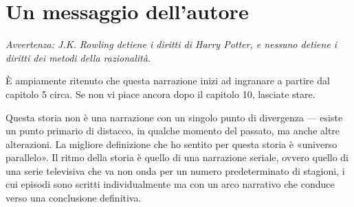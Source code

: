 
\chapter*{Un messaggio dell’autore}

\emph{Avvertenza: J.K. Rowling detiene i diritti di Harry Potter, e nessuno detiene i diritti dei metodi della razionalità.}

È ampiamente ritenuto che questa narrazione inizi ad ingranare a partire dal capitolo 5 circa. Se non vi piace ancora dopo il capitolo 10, lasciate stare.

Questa storia non è una narrazione con un singolo punto di divergenza — esiste un punto primario di distacco, in qualche momento del passato, ma anche altre alterazioni. La migliore definizione che ho sentito per questa storia è «universo parallelo». Il ritmo della storia è quello di una narrazione seriale, ovvero quello di una serie televisiva che va non onda per un numero predeterminato di stagioni, i cui episodi sono scritti individualmente ma con un arco narrativo che conduce verso una conclusione definitiva.

